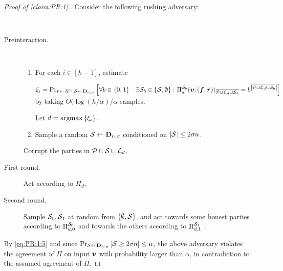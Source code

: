 \begin{proof}[Proof of \cref{claim:PR:1}.]
{\samepage
\noindent
Consider the following rushing adversary:

\begin{algorithm}[$\Ac$]~
	
		\begin{description}
		\item[Preinteraction.]  ~
		
		
		\begin{enumerate}
			\item  For each $i\in [h-1]$, estimate
			
			
			$\xi_i  = \Pr_{{ \boldsymbol{r}}\gets \mathcal{R}^n,\mathcal{S} \gets \mathbf{D}_{n,\sigma}}\left[\forall b\in \{0,1\}  \quad \exists  {\cal{S}}_b \in \left\{{\cal{S}},\emptyset\right\} \colon  \Pi^{ {\cal{S}}_b}_{d}({ \boldsymbol{v}};({ \boldsymbol{f}},{ \boldsymbol{r}}))_{\overline{ \mathcal{P} \cup {\cal{L}}_d \cup {\cal{S}}_b}}= b^{ \left|\overline{ \mathcal{P} \cup {\cal{L}}_d \cup {\cal{S}}_b}\right|}\right] $ by taking $\Theta(\log (h/\alpha)/\alpha$ samples.
			
			
			Let $d = \operatorname*{argmax}\left\{\xi_i\right\}$.
			
		
			
			\item Sample a random $\mathcal{S} \gets \mathbf{D}_{n,\sigma} $ conditioned on $\left|{\cal{S}}\right| \le 2\sigma n$.
		\end{enumerate}
		
		 Corrupt the parties in $\mathcal{P} \cup \mathcal{S}\cup {\cal{L}}_d$.
	
	\item[First round.] Act according to $\Pi_d$.
	
	\item[Second round.] Sample  ${\cal{S}}_0,{\cal{S}}_1$ at random from $\left\{\emptyset,{\cal{S}}\right\}$, and act towards some honest parties according to $\Pi^{{\cal{S}}_0}_{d,0}$  and towards the others according to  $\Pi^{{\cal{S}}_1}_{d,1}$ .
\end{description}
\end{algorithm}
}
By \cref{eq:PR:1:5} and since $\Pr_{{\cal{S}} \gets \mathbf{D}_{n,\sigma}}\left[{\cal{S}} \ge 2\sigma n\right] \le \alpha$, the above adversary violates the agreement of $\Pi$ on input ${ \boldsymbol{v}}$ with probability larger than $\alpha$, in contradiction to the assumed agreement of $\Pi$.
\end{proof}



























